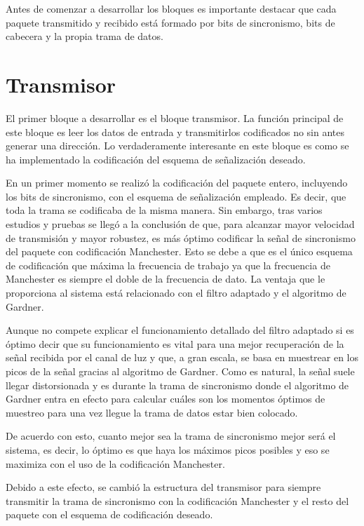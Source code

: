 Antes de comenzar a desarrollar los bloques es importante destacar que cada paquete 
transmitido y recibido está formado por bits de sincronismo, bits de cabecera y la propia 
trama de datos. 

\newpage

\section{Transmisor}
El primer bloque a desarrollar es el bloque transmisor. La función principal de este 
bloque es leer los datos de entrada y transmitirlos codificados no sin antes generar una 
dirección. Lo verdaderamente interesante en este bloque es como se ha implementado la 
codificación del esquema de señalización deseado.

En un primer momento se realizó la codificación del paquete entero, incluyendo los bits
de sincronismo, con el esquema de señalización empleado. Es decir, que toda la trama se 
codificaba de la misma manera. Sin embargo, tras varios estudios y pruebas se llegó a la 
conclusión de que, para alcanzar mayor velocidad de transmisión y mayor robustez, es más 
óptimo codificar la señal de sincronismo del paquete con codificación Manchester. Esto se 
debe a que es el único esquema de codificación que máxima la frecuencia de trabajo ya 
que la frecuencia de Manchester es siempre el doble de la frecuencia de dato. La 
ventaja que le proporciona al sistema está relacionado con el filtro adaptado y el 
algoritmo de Gardner. 

Aunque no compete explicar el funcionamiento detallado del filtro adaptado si es 
óptimo decir que su funcionamiento es vital para una mejor recuperación de la señal 
recibida por el canal de luz y que, a gran escala, se basa en muestrear en los picos
de la señal gracias al algoritmo de Gardner. Como es natural, la señal suele llegar 
distorsionada y es durante la trama de sincronismo donde el algoritmo de Gardner entra 
en efecto para calcular cuáles son los momentos óptimos de muestreo para una vez llegue 
la trama de datos estar bien colocado. 

De acuerdo con esto, cuanto mejor sea la trama de sincronismo mejor será el sistema, 
es decir, lo
óptimo es que haya los máximos picos posibles y eso se maximiza con el uso de la 
codificación Manchester.

Debido a este efecto, se cambió la estructura del transmisor para siempre transmitir la 
trama de sincronismo con la codificación Manchester y el resto del paquete con el esquema 
de codificación deseado.

